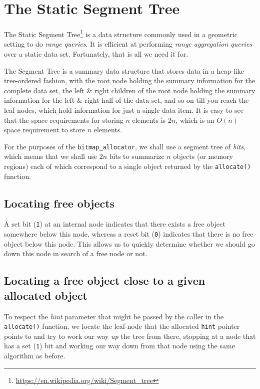 \documentclass{article}
\begin{document}
\section{The Static Segment Tree}

The Static Segment
Tree\footnote{\url{https://en.wikipedia.org/wiki/Segment_tree}} is a
data structure commonly used in a geometric setting to do
\textit{range queries}. It is efficient at performing \textit{range
  aggregation queries} over a static data set. Fortunately, that is
all we need it for.

The Segment Tree is a summary data structure that stores data in a
heap-like tree-ordered fashion, with the root node holding the summary
information for the complete data set, the left \& right children of
the root node holding the summary information for the left \& right
half of the data set, and so on till you reach the leaf nodes, which
hold information for just a single data item. It is easy to see that
the space requirements for storing $n$ elements is $2n$, which is an
$O(n)$ space requirement to store $n$ elements.

For the purposes of the \texttt{bitmap\_allocator}, we shall use a
segment tree of \textit{bits}, which means that we shall use $2n$ bits
to summarize $n$ objects (or memory regions) each of which correspond
to a single object returned by the \texttt{allocate()} function.

\subsection{Locating free objects}

A set bit (\texttt{1}) at an internal node indicates that there exists
a free object somewhere below this node, whereas a reset bit
(\texttt{0}) indicates that there is no free object below this
node. This allows us to quickly determine whether we should go down
this node in search of a free node or not.

\subsection{Locating a free object close to a given allocated object}

To respect the \textit{hint} parameter that might be passed by the
caller in the \texttt{allocate()} function, we locate the leaf-node
that the allocated \texttt{hint} pointer points to and try to work our
way \textit{up} the tree from there, stopping at a node that has a set
(\texttt{1}) bit and working our way down from that node using the
same algorithm as before.
\end{document}
